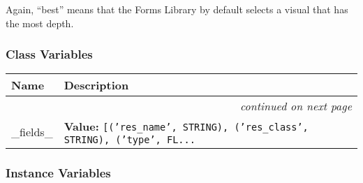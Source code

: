Again, ``best'' means that the Forms Library by default selects a visual
that has the most depth.


  \subsubsection{Class Variables}

    \vspace{-1cm}
\hspace{\varindent}\begin{longtable}{|p{\varnamewidth}|p{\vardescrwidth}|l}
\cline{1-2}
\cline{1-2} \centering \textbf{Name} & \centering \textbf{Description}& \\
\cline{1-2}
\endhead\cline{1-2}\multicolumn{3}{r}{\small\textit{continued on next page}}\\\endfoot\cline{1-2}
\endlastfoot\raggedright \_\-f\-i\-e\-l\-d\-s\-\_\- & \raggedright \textbf{Value:} 
{\tt [('res\_name', STRING), ('res\_class', STRING), ('type', FL\texttt{...}}&\\
\cline{1-2}
\end{longtable}



  \subsubsection{Instance Variables}

